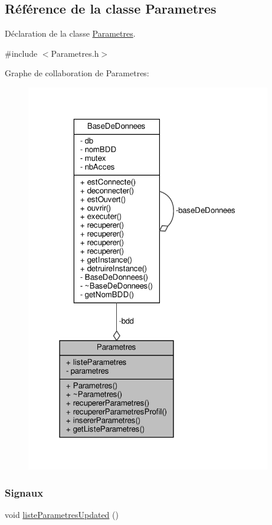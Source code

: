 \hypertarget{class_parametres}{}\subsection{Référence de la classe Parametres}
\label{class_parametres}


Déclaration de la classe \hyperlink{class_parametres}{Parametres}.  




{\ttfamily \#include $<$Parametres.\+h$>$}



Graphe de collaboration de Parametres\+:\nopagebreak
\begin{figure}[H]
\begin{center}
\leavevmode
\includegraphics[width=304pt]{class_parametres__coll__graph}
\end{center}
\end{figure}
\subsubsection*{Signaux}
\begin{DoxyCompactItemize}
\item 
void \hyperlink{class_parametres_aa6649347b6e61f767dc14346f2ea858e}{liste\+Parametres\+Updated} ()
\end{DoxyCompactItemize}
